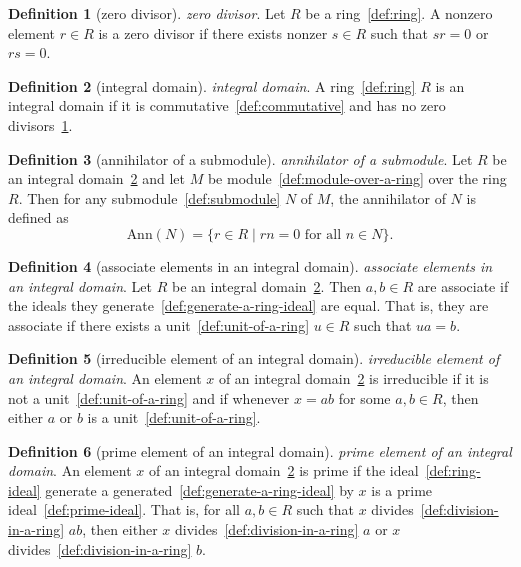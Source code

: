 \documentclass[12pt,a4paper]{article}
\theoremstyle{definition}
\newtheorem{definition}{Definition}
\begin{document}
\begin{definition}[zero divisor]\label{def:zero-divisor}
\emph{zero divisor}. Let $R$ be a ring~\ref{def:ring}. A nonzero element $r\in R$ is a zero divisor if there exists nonzer $s\in R$ such that $sr = 0$ or $rs = 0$.
\end{definition}

\begin{definition}[integral domain]\label{def:integral-domain}
\emph{integral domain}. A ring~\ref{def:ring} $R$ is an integral domain if it is commutative~\ref{def:commutative} and has no zero divisors~\ref{def:zero-divisor}.
\end{definition}

\begin{definition}[annihilator of a submodule]\label{def:annihilator-of-a-submodule}
\emph{annihilator of a submodule}. Let $R$ be an integral domain~\ref{def:integral-domain} and let $M$ be module~\ref{def:module-over-a-ring} over the ring $R$. Then for any submodule~\ref{def:submodule} $N$ of $M$, the annihilator of $N$ is defined as $$\text{Ann}(N) = \{r\in R\mid rn=0\text{ for all } n\in N\}.$$
\end{definition}

\begin{definition}[associate elements in an integral domain]\label{def:associate-elements-in-an-integral-domain}
\emph{associate elements in an integral domain}. Let $R$ be an integral domain~\ref{def:integral-domain}. Then $a,b\in R$ are associate if the ideals they generate~\ref{def:generate-a-ring-ideal} are equal. That is, they are associate if there exists a unit~\ref{def:unit-of-a-ring} $u\in R$ such that $ua=b$.
\end{definition}

\begin{definition}[irreducible element of an integral domain]\label{def:irreducible-element-of-an-integral-domain}
\emph{irreducible element of an integral domain}. An element $x$ of an integral domain~\ref{def:integral-domain} is irreducible if it is not a unit~\ref{def:unit-of-a-ring} and if whenever $x=ab$ for some $a,b\in R$, then either $a$ or $b$ is a unit~\ref{def:unit-of-a-ring}.
\end{definition}

\begin{definition}[prime element of an integral domain]\label{def:prime-element-of-an-integral-domain}
\emph{prime element of an integral domain}. An element $x$ of an integral domain~\ref{def:integral-domain} is prime if the ideal~\ref{def:ring-ideal} generate a generated~\ref{def:generate-a-ring-ideal} by $x$ is a prime ideal~\ref{def:prime-ideal}. That is, for all $a,b \in R$ such that $x$ divides~\ref{def:division-in-a-ring} $ab$, then either $x$ divides~\ref{def:division-in-a-ring} $a$ or $x$ divides~\ref{def:division-in-a-ring} $b$.
\end{definition}
\end{document}
